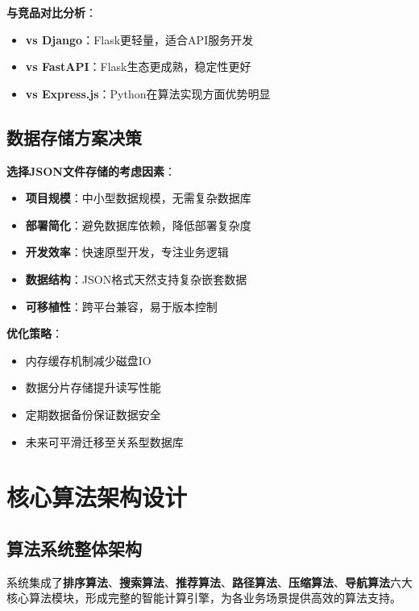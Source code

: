 \documentclass[12pt,a4paper]{article}
\begin{document}
\textbf{与竞品对比分析}：
\begin{itemize}
    \item \textbf{vs Django}：Flask更轻量，适合API服务开发
    \item \textbf{vs FastAPI}：Flask生态更成熟，稳定性更好
    \item \textbf{vs Express.js}：Python在算法实现方面优势明显
\end{itemize}

\subsection{数据存储方案决策}

\begin{warningbox}[title={JSON文件存储方案权衡}]
\textbf{选择JSON文件存储的考虑因素}：
\begin{itemize}[nosep]
    \item \textbf{项目规模}：中小型数据规模，无需复杂数据库
    \item \textbf{部署简化}：避免数据库依赖，降低部署复杂度
    \item \textbf{开发效率}：快速原型开发，专注业务逻辑
    \item \textbf{数据结构}：JSON格式天然支持复杂嵌套数据
    \item \textbf{可移植性}：跨平台兼容，易于版本控制
\end{itemize}
\end{warningbox}

\textbf{优化策略}：
\begin{itemize}
    \item 内存缓存机制减少磁盘IO
    \item 数据分片存储提升读写性能
    \item 定期数据备份保证数据安全
    \item 未来可平滑迁移至关系型数据库
\end{itemize}

\section{核心算法架构设计}

\subsection{算法系统整体架构}

\begin{infobox}[title={六大核心算法模块}]
系统集成了\textcolor{primary}{\textbf{排序算法}}、\textcolor{secondary}{\textbf{搜索算法}}、\textcolor{accent}{\textbf{推荐算法}}、\textcolor{success}{\textbf{路径算法}}、\textcolor{warning}{\textbf{压缩算法}}、\textcolor{danger}{\textbf{导航算法}}六大核心算法模块，形成完整的智能计算引擎，为各业务场景提供高效的算法支持。
\end{infobox}
\end{document}
